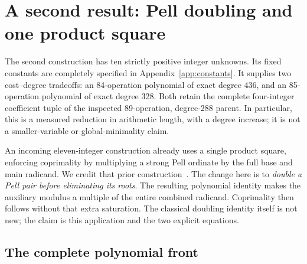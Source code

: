 \section{A second result: Pell doubling and one product square}
\label{sec:doubling-square}

The second construction has ten strictly positive integer unknowns. Its fixed constants are completely specified in Appendix~\ref{app:constants}.
It supplies two cost--degree tradeoffs: an 84-operation polynomial of
exact degree 436, and an 85-operation polynomial of exact degree 328.
Both retain the complete four-integer coefficient tuple of the inspected
89-operation, degree-288 parent.  In particular, this is a measured
reduction in arithmetic length, with a degree increase; it is not a
smaller-variable or global-minimality claim.

An incoming eleven-integer construction already uses a single product
square, enforcing coprimality by multiplying a strong Pell ordinate by
the full base and main radicand.  We credit that prior construction~\cite{binomial}.
The change here is to \emph{double a Pell pair before eliminating its
roots}.  The resulting polynomial identity makes the auxiliary modulus
a multiple of the entire combined radicand.  Coprimality then follows
without that extra saturation.  The classical doubling identity itself
is not new; the claim is this application and the two explicit equations.

\subsection{The complete polynomial front}

